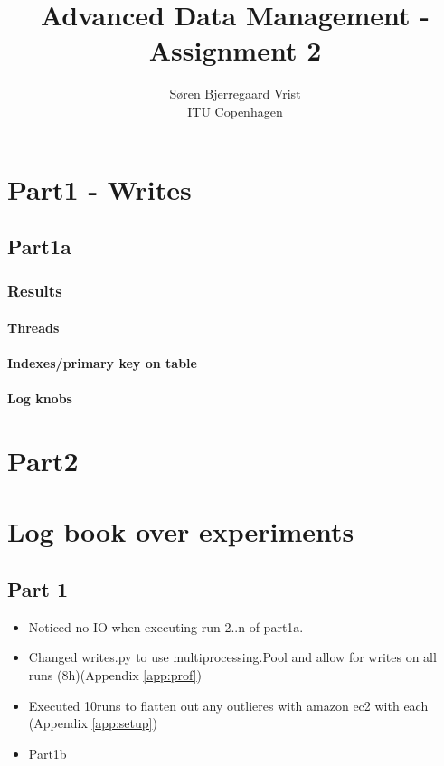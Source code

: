 
\title{Advanced Data Management - Assignment 2}
\author{S\o ren Bjerregaard Vrist\\ITU Copenhagen}


\maketitle

\chapter{Part1 - Writes}
\section{Part1a}

\subsection{Results}
\subsubsection{Threads}
\subsubsection{Indexes/primary key on table}
\subsubsection{Log knobs}


\chapter{Part2}


\chapter{Log book over experiments}

\section{Part 1}
\begin{itemize}
  \item Noticed no IO when executing run 2..n of part1a.
  \item Changed writes.py to use multiprocessing.Pool and allow for writes on
    all runs (8h)(Appendix \ref{app:prof})
  \item Executed 10runs to flatten out any outlieres with amazon ec2 with each
    (Appendix \ref{app:setup})
  \item Part1b 
\end{itemize}

